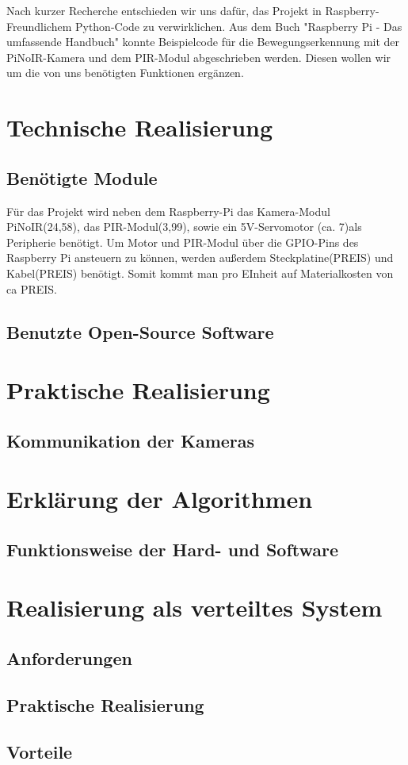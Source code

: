 \documentclass[12pt,a4paper]{scrreprt}
\begin{document}
Nach kurzer Recherche entschieden wir uns dafür, das Projekt in Raspberry-Freundlichem Python-Code zu verwirklichen.
Aus dem Buch "Raspberry Pi - Das umfassende Handbuch" konnte Beispielcode für die Bewegungserkennung mit der PiNoIR-Kamera und dem PIR-Modul abgeschrieben werden.
Diesen wollen wir um die von uns benötigten Funktionen ergänzen.

\chapter{Technische Realisierung}
\section{Benötigte Module}
Für das Projekt wird neben dem Raspberry-Pi das Kamera-Modul PiNoIR(24,58), das PIR-Modul(3,99), sowie ein 5V-Servomotor (ca. 7)als Peripherie benötigt. Um Motor und PIR-Modul über die GPIO-Pins des Raspberry Pi ansteuern zu können, werden außerdem Steckplatine(PREIS) und Kabel(PREIS) benötigt.
Somit kommt man pro EInheit auf Materialkosten von ca PREIS.






\section{Benutzte Open-Source Software}

\chapter{Praktische Realisierung}
\section{Kommunikation der Kameras}


\chapter{Erklärung der Algorithmen}
\section{Funktionsweise der Hard- und Software}

\chapter{Realisierung als verteiltes System}
\section{Anforderungen}

\section{Praktische Realisierung}

\section{Vorteile}
\end{document}
